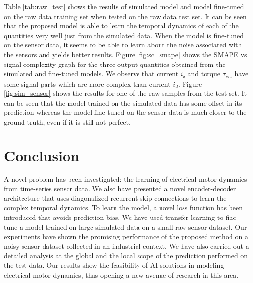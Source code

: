 \documentclass[letterpaper]{article}
\begin{document}
Table \ref{tab:raw_test} shows the results of simulated model and model fine-tuned on the raw data training set when tested on the raw data test set. It can be seen that the proposed model is able to learn the temporal dynamics of each of the quantities very well just from the simulated data. When the model is fine-tuned on the sensor data, it seems to be able to learn about the noise associated with the sensors and yields better results. Figure \ref{fig:sc_smape} shows the SMAPE vs signal complexity graph for the three output quantities obtained from the simulated and fine-tuned models. We observe that current $i_q$ and torque $\tau_{em}$ have some signal parts which are more complex than current $i_d$. Figure \ref{fig:sim_sensor} shows the results for one of the raw samples from the test set. It can be seen that the model trained on the simulated data has some offset in its prediction whereas the model fine-tuned on the sensor data is much closer to the ground truth, even if it is still not perfect.

\section{Conclusion}
\label{sec:concl}
A novel problem has been investigated: the learning of electrical motor dynamics from time-series sensor data. We also have presented a novel encoder-decoder architecture that uses diagonalized recurrent skip connections to learn the complex temporal dynamics. To learn the model, a novel loss function has been introduced that avoids prediction bias. We have used transfer learning to fine tune a model trained on large simulated data on a small raw sensor dataset. Our experiments have shown the promising performance of the proposed method on a noisy sensor dataset collected in an industrial context. We have also carried out a detailed analysis at the global and the local scope of the prediction performed on the test data. Our results show the feasibility of AI solutions in modeling electrical motor dynamics, thus opening a new avenue of research in this area.



\fontsize{9.0pt}{10.0pt} \selectfont

\end{document}
